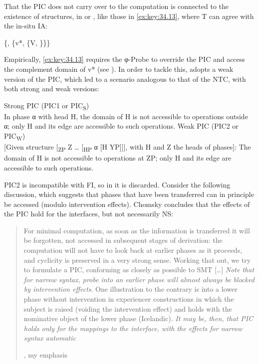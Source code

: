 \documentclass[output=paper]{langsci/langscibook}
\begin{document}
That the \gls{PIC} does not carry over to the computation is connected to the
existence of structures, in  or , like those in \eqref{ex:key:34.13}, where T
can agree with the in-situ \gls{IA}:

\ea\label{ex:key:34.13}
    \{, \{v*, \{V, \}\}\}
    \vspace{1\baselineskip}
\z

Empirically, \eqref{ex:key:34.13} requires the φ-Probe to override the \gls{PIC} and access the
complement domain of v* (see \citealt{Richards2012}). In order to tackle this,
\textcite{Chomsky2001,Chomsky2004} adopts a weak version of the \gls{PIC}, which led to a
scenario analogous to that of the \gls{NTC}, with both strong and weak
versions:

\ea%
	\ea\label{ex:key:34.14a}Strong \gls{PIC} (PIC1 or PIC\textsubscript{S})\\
        In phase α with head H, the domain of H is not accessible to operations
        outside α; only H and its edge are accessible to such operations.
        \parencite[108]{Chomsky2000}
	\ex\label{ex:key:34.14b}Weak \gls{PIC} (PIC2 or PIC\textsubscript{W})\\
        {}[Given structure [\textsubscript{ZP} Z \dots{} [\textsubscript{HP} α
        [H YP]]], with H and Z the heads of phases]: The domain of H is not
        accessible to operations at ZP; only H and its edge are accessible to
        such operations. \parencite[14]{Chomsky2001}
	\z
\z

PIC2 is incompatible with \gls{FI}, so in \citet{Chomsky2008} it is discarded.
Consider the following discussion, which suggests that phases that have been
transferred can in principle be accessed (modulo intervention effects). Chomsky
concludes that the effects of the \gls{PIC} hold for the interfaces, but not
necessarily \gls{NS}:

\blockquote[{\citealt[143]{Chomsky2008}, my emphasis}][.]{For minimal
    computation, as soon as the information is transferred it will be
    forgotten, not accessed in subsequent stages of derivation: the computation
    will not have to look back at earlier phases as it proceeds, and cyclicity
    is preserved in a very strong sense. Working that out, we try to formulate
    a \gls{PIC}, conforming as closely as possible to \gls{SMT} [\dots{}]
    \emph{Note that for narrow syntax, probe into an earlier phase will
    almost always be blocked by intervention effects}. One illustration to the
    contrary is  into a lower phase without intervention in
    experiencer constructions in which the subject is raised (voiding the
    intervention effect) and  holds with the nominative object of the
    lower phase (Icelandic). \emph{It may be, then, that \gls{PIC} holds only
        for the mappings to the interface, with the effects for narrow syntax
automatic}}
\end{document}
